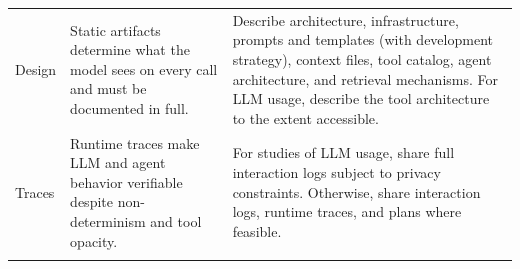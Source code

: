 \documentclass[smallextended]{svjour3}
\newcommand{\must}{\textbf{must}\xspace}
\newcommand{\should}{\textbf{should}\xspace}
\newcommand{\iconM}{\usebox{\iconMbox}\xspace}
\newcommand{\iconS}{\usebox{\iconSbox}\xspace}
\newcommand{\iconM}{●\xspace}
\newcommand{\iconS}{○\xspace}
\newcommand{\llmusage}{\hyperref[sec:studying-llm-usage-in-software-engineering]{\emph{Studying LLM Usage}}\xspace}
\newcommand{\llmusage}{\href{/study-types\#studying-llm-usage-in-software-engineering}{\emph{Studying LLM Usage}}\xspace}
\begin{document}
\begin{appendices}
\begin{center}
\begin{tabularx}{\textwidth}{@{}l>{\raggedright\arraybackslash}X>{\raggedright\arraybackslash}X@{}}
Design & Static artifacts determine what the model sees on every call and must be documented in full. &
\iconM Describe architecture, infrastructure, prompts and templates (with development strategy), context files, tool catalog, agent architecture, and retrieval mechanisms.
\newline \iconS For LLM usage, describe the tool architecture to the extent accessible. \\
\addlinespace
Traces & Runtime traces make LLM and agent behavior verifiable despite non-determinism and tool opacity. &
\iconM For studies of LLM usage, share full interaction logs subject to privacy constraints.
\newline \iconS Otherwise, share interaction logs, runtime traces, and plans where feasible. \\
\addlinespace

\end{tabularx}
\end{center}
\end{appendices}
\end{document}
